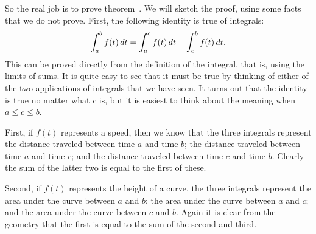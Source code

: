 \begin{mainTheorem}
So the real job is to prove
theorem~. We will sketch the proof,
using some facts that we do not prove. First, the following identity
is true of integrals:
$$
  \int_a^b f(t)\, d t = \int_a^c f(t)\, d t + \int_c^b f(t)\, d t.
$$
This can be proved directly from the definition of the integral, that
is, using the limits of sums. It is quite easy to see that it must be
true by thinking of either of the two applications of integrals that
we have seen. It turns out that the identity is true no matter what
$c$ is, but it is easiest to think about the meaning when 
$a\le c\le b$.

First, if $f(t)$ represents a speed, then we know that the three
integrals represent the distance traveled between time $a$ and time $b$;
the distance traveled between time $a$ and time $c$; and 
the distance traveled between time $c$ and time $b$. Clearly the sum of
the latter two is equal to the first of these.

Second, if $f(t)$ represents the height of a curve, the three
integrals represent the area under the curve between $a$ and $b$;
the area under the curve between $a$ and $c$;
and the area under the curve between $c$ and $b$. Again it is clear
from the geometry that the first is equal to the sum of the second and
third. 



\end{mainTheorem}
